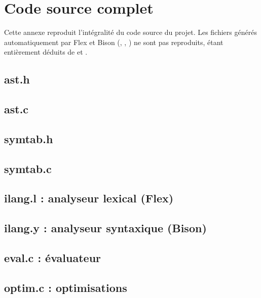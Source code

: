 \chapter{Code source complet}
\label{annexe:code}

Cette annexe reproduit l'intégralité du code source du projet. Les fichiers
générés automatiquement par Flex et Bison (, ,
) ne sont pas reproduits, étant entièrement déduits de
 et .

\section{ast.h}


\section{ast.c}


\section{symtab.h}


\section{symtab.c}


\section{ilang.l : analyseur lexical (Flex)}


\section{ilang.y : analyseur syntaxique (Bison)}


\section{eval.c : évaluateur}


\section{optim.c : optimisations}



